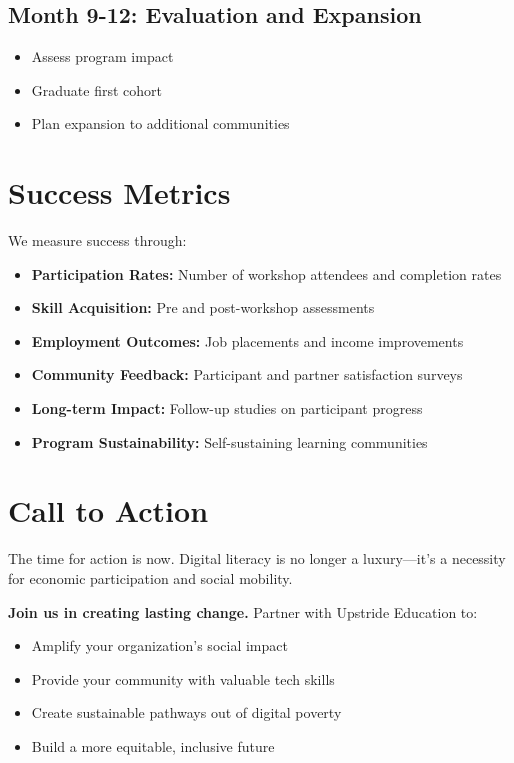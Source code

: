 \documentclass[12pt,a4paper]{article}
\begin{document}
\subsection{Month 9-12: Evaluation and Expansion}
\begin{itemize}[leftmargin=*]
    \item Assess program impact
    \item Graduate first cohort
    \item Plan expansion to additional communities
\end{itemize}

\section{Success Metrics}

We measure success through:

\begin{itemize}[leftmargin=*]
    \item \textbf{Participation Rates:} Number of workshop attendees and completion rates
    \item \textbf{Skill Acquisition:} Pre and post-workshop assessments
    \item \textbf{Employment Outcomes:} Job placements and income improvements
    \item \textbf{Community Feedback:} Participant and partner satisfaction surveys
    \item \textbf{Long-term Impact:} Follow-up studies on participant progress
    \item \textbf{Program Sustainability:} Self-sustaining learning communities
\end{itemize}

\section{Call to Action}

The time for action is now. Digital literacy is no longer a luxury—it's a necessity for economic participation and social mobility.

\textbf{Join us in creating lasting change.} Partner with Upstride Education to:
\begin{itemize}[leftmargin=*]
    \item Amplify your organization's social impact
    \item Provide your community with valuable tech skills
    \item Create sustainable pathways out of digital poverty
    \item Build a more equitable, inclusive future
\end{itemize}
\end{document}
